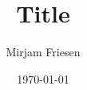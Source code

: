 \documentclass[12pt, a4paper]{article}
\begin{document}
\title{Title}
\author{Mirjam Friesen}
\date{\today}
\maketitle

\begin{abstract}
\end{abstract}



\appendix 
 


\listoftodos
\end{document}
